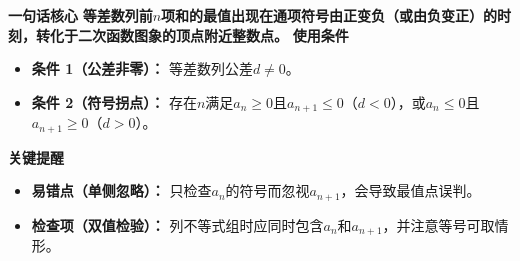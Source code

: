 \begin{summarybox}
	\textbf{\textcolor{CSummary}{一句话核心}}
	\textbf{等差数列前$n$项和的最值出现在通项符号由正变负（或由负变正）的时刻，转化于二次函数图象的顶点附近整数点。}
	\medskip
	\textbf{\textcolor{CSummary}{使用条件}}
	\begin{itemize}[leftmargin=*, itemsep=0.5em, topsep=0.4em]
		\item \textbf{条件 1（公差非零）：} 等差数列公差$d\neq0$。
		\item \textbf{条件 2（符号拐点）：} 存在$n$满足$a_n\ge0$且$a_{n+1}\le0$（$d<0$），或$a_n\le0$且$a_{n+1}\ge0$（$d>0$）。
	\end{itemize}
	\medskip
	\textbf{\textcolor{CSummary}{关键提醒}}
	\begin{itemize}[leftmargin=*, itemsep=0.5em, topsep=0.4em]
		\item \textbf{易错点（单侧忽略）：} 只检查$a_n$的符号而忽视$a_{n+1}$，会导致最值点误判。
		\item \textbf{检查项（双值检验）：} 列不等式组时应同时包含$a_n$和$a_{n+1}$，并注意等号可取情形。
	\end{itemize}
\end{summarybox}
